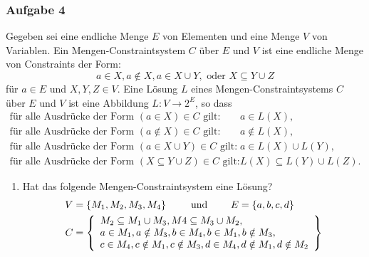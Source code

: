\documentclass{beamer}
\begin{document}
	\begin{frame} \frametitle{Aufgabe 4}
		\footnotesize \justifying
		Gegeben sei eine endliche Menge $E$ von Elementen und eine Menge $V$ von Variablen. Ein
		Mengen-Constraintsystem $C$ über $E$ und $V$ ist eine endliche Menge von Constraints der Form:
		\begin{equation*}
			a \in X, a \notin X, a \in X \cup Y, \text{ oder } X \subseteq Y \cup Z
		\end{equation*}
		für $a \in E$ und $X, Y, Z \in V$. Eine Lösung $L$ eines Mengen-Constraintsystems $C$ über $E$ und $V$
		ist eine Abbildung $L : V \to 2^E$, so dass
		\begin{align*}
			\text{für alle Ausdrücke der Form } (a \in X) \in C \text{ gilt}: \quad &a \in L(X), \\
			\text{für alle Ausdrücke der Form } (a \notin X) \in C \text{ gilt}: \quad &a \notin L(X), \\
			\text{für alle Ausdrücke der Form } (a \in X \cup Y ) \in C \text{ gilt}: \quad &a \in L(X) \cup L(Y ), \\
			\text{für alle Ausdrücke der Form } (X \subseteq Y \cup Z) \in C \text{ gilt}: \quad &L(X) \subseteq L(Y ) \cup L(Z).
		\end{align*}
		
		\begin{enumerate}[\bfseries a)]
			\item Hat das folgende Mengen-Constraintsystem eine Lösung?
			\begin{align*}
				V &= \left\{ M_1, M_2, M_3, M_4 \right\} \qquad \text{ und } \qquad
				E = \left\{ a, b, c, d \right\} \\
				C &= \left\{ 
					\begin{array}{l}
						M_2 \subseteq M_1 \cup M_3, M4 \subseteq M_3 \cup M_2, \\
						a \in M_1, a \notin M_3, b \in M_4, b \in M_1, b \notin M_3, \\
						c \in M_4, c \notin M_1, c \notin M_3, d \in M_4, d \notin M_1, d \notin M_2
					\end{array}  \right\}
			\end{align*}
		\end{enumerate}
	\end{frame}
\end{document}
